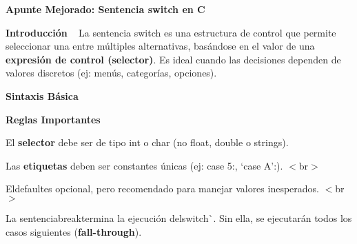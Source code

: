 {\bfseries{Apunte Mejorado\+: Sentencia switch en C}}



{\bfseries{Introducción}} ~\newline
 La sentencia {\ttfamily switch} es una estructura de control que permite seleccionar una entre múltiples alternativas, basándose en el valor de una {\bfseries{expresión de control (selector)}}. Es ideal cuando las decisiones dependen de valores discretos (ej\+: menús, categorías, opciones).



{\bfseries{Sintaxis Básica}} ~\newline
 
\begin{DoxyCode}{0}
\DoxyCodeLine{        \textcolor{keywordflow}{break};}
\DoxyCodeLine{        \textcolor{keywordflow}{break};}
\DoxyCodeLine{    \textcolor{keywordflow}{default}: }
\DoxyCodeLine{\}}

\end{DoxyCode}




{\bfseries{Reglas Importantes}} ~\newline

\begin{DoxyEnumerate}
\item El {\bfseries{selector}} debe ser de tipo {\ttfamily int} o {\ttfamily char} (no {\ttfamily float}, {\ttfamily double} o strings). ~\newline

\item Las {\bfseries{etiquetas}} deben ser constantes únicas (ej\+: {\ttfamily case 5\+:}, `case \textquotesingle{}A'\+:{\ttfamily ). \texorpdfstring{$<$}{<}br\texorpdfstring{$>$}{>}}
\item {\ttfamily El}default{\ttfamily es opcional, pero recomendado para manejar valores inesperados. \texorpdfstring{$<$}{<}br\texorpdfstring{$>$}{>}}
\item {\ttfamily La sentencia}break{\ttfamily termina la ejecución del}switch\`{}. Sin ella, se ejecutarán todos los casos siguientes ({\bfseries{fall-\/through}}). ~\newline

\end{DoxyEnumerate}

